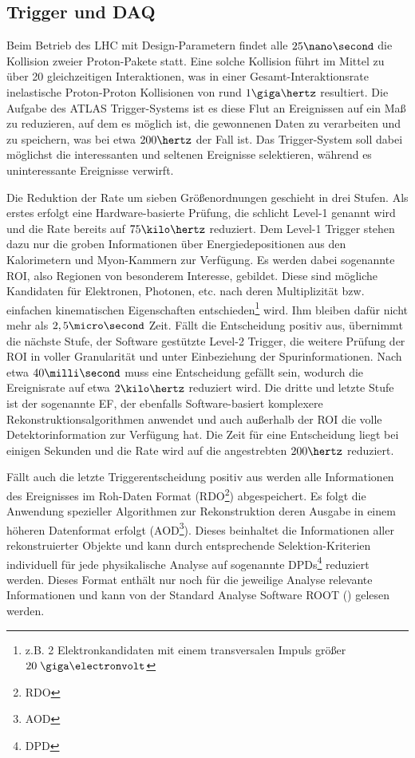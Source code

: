 \subsection{Trigger und DAQ}
\label{trigger_daq}
Beim Betrieb des \ac{LHC} mit Design-Parametern findet alle $25\nano\second$
die Kollision zweier Proton-Pakete statt. Eine solche Kollision führt im Mittel
zu über 20 gleichzeitigen Interaktionen, was in einer Gesamt-Interaktionsrate
inelastische Proton-Proton Kollisionen von rund $1\giga\hertz$ resultiert. Die
Aufgabe des ATLAS Trigger-Systems ist es diese Flut an Ereignissen auf ein Maß
zu reduzieren, auf dem es möglich ist, die gewonnenen Daten zu verarbeiten und
zu speichern, was bei etwa $200\hertz$ der Fall ist. Das Trigger-System soll
dabei möglichst die interessanten und seltenen Ereignisse selektieren, während
es uninteressante Ereignisse verwirft.

Die Reduktion der Rate um sieben Größenordnungen geschieht in drei Stufen.
Als erstes erfolgt eine Hardware-basierte Prüfung, die schlicht Level-1 genannt
wird und die Rate bereits auf $75\kilo\hertz$ reduziert. Dem Level-1 Trigger
stehen dazu nur die groben Informationen über Energiedepositionen aus den
Kalorimetern und Myon-Kammern zur Verfügung. Es werden dabei sogenannte
\acf{ROI}, also Regionen von besonderem Interesse, gebildet. Diese sind
mögliche Kandidaten für Elektronen, Photonen, etc. nach deren Multiplizität
bzw. einfachen kinematischen Eigenschaften entschieden\footnote{z.B. 2
Elektronkandidaten mit einem transversalen Impuls größer $20\GeV$} wird. Ihm
bleiben dafür nicht mehr als $2,5\micro\second$ Zeit. Fällt die Entscheidung
positiv aus, übernimmt die nächste Stufe, der Software gestützte Level-2
Trigger, die weitere Prüfung der \ac{ROI} in voller Granularität und unter
Einbeziehung der Spurinformationen. Nach etwa $40\milli\second$ muss eine
Entscheidung gefällt sein, wodurch die Ereignisrate auf etwa $2\kilo\hertz$
reduziert wird. Die dritte und letzte Stufe ist der sogenannte \acf{EF}, der
ebenfalls Software-basiert komplexere Rekonstruktionsalgorithmen anwendet und
auch außerhalb der \ac{ROI} die volle Detektorinformation zur Verfügung hat.
Die Zeit für eine Entscheidung liegt bei einigen Sekunden und die Rate wird
auf die angestrebten $200\hertz$ reduziert.  

Fällt auch die letzte Triggerentscheidung positiv aus werden alle Informationen
des Ereignisses im Roh-Daten Format (RDO\footnote{\acf{RDO}}) abgespeichert. Es
folgt die Anwendung spezieller Algorithmen zur Rekonstruktion deren Ausgabe in
einem höheren Datenformat erfolgt (AOD\footnote{\acf{AOD}}). Dieses beinhaltet
die Informationen aller rekonstruierter Objekte und kann durch entsprechende
Selektion-Kriterien individuell für jede physikalische Analyse auf sogenannte
DPDs\footnote{\acf{DPD}} reduziert werden. Dieses Format enthält nur noch für
die jeweilige Analyse relevante Informationen und kann von der Standard
Analyse Software \textsc{ROOT} (\cite{Brun:2000es}) gelesen werden.

